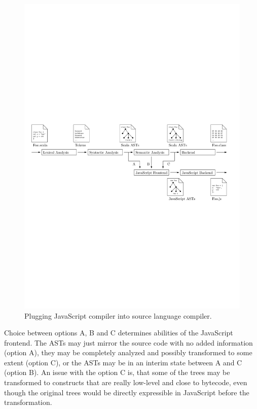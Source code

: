 \documentclass[12pt,a4paper]{report}
\begin{document}
\begin{figure}[ht]
  \centering
	\includegraphics[width=\linewidth,height=\textheight,keepaspectratio]{img/CompilerComplete.pdf}
	\caption{Plugging JavaScript compiler into source language compiler.}
	\label{CompilerComplete}
\end{figure}

Choice between options A, B and C determines abilities of the JavaScript frontend. The ASTs may just mirror the source code with no added information (option A), they may be completely analyzed and possibly transformed to some extent (option C), or the ASTs may be in an interim state between A and C (option B). An issue with the option C is, that some of the trees may be transformed to constructs that are really low-level and close to bytecode, even though the original trees would be directly expressible in JavaScript before the transformation.
\end{document}
